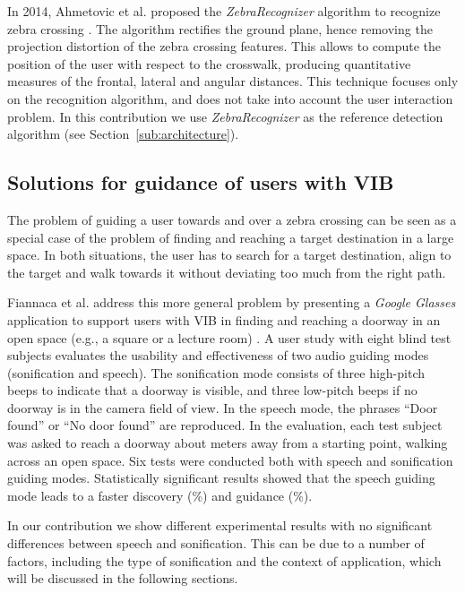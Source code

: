 \documentclass{article}
\begin{document}
In 2014, Ahmetovic et al. proposed the \emph{ZebraRecognizer} algorithm to recognize zebra crossing \cite{AhmetovicICPR2014}.
The algorithm rectifies the ground plane, hence removing the projection distortion of the zebra crossing features. This allows to compute the position of the user with respect to the crosswalk, producing quantitative measures of the frontal, lateral and angular distances.
This technique focuses only on the recognition algorithm, and does not take into account the user interaction problem.
In this contribution we use \emph{ZebraRecognizer} as the reference detection algorithm (see Section~\ref{sub:architecture}).

\subsection{Solutions for guidance of users with VIB}
\label{sub:guidanceRW}
The problem of guiding a user towards and over a zebra crossing can be seen as a special case of the problem of finding and reaching a target destination in a large space.
In both situations, the user has to search for a target destination, align to the target and walk towards it without deviating too much from the right path.

Fiannaca et al. address this more general problem by presenting a \emph{Google Glasses} application to support users with VIB in finding and reaching a doorway in an open space (e.g., a square or a lecture room) \cite{fiannaca}.
A user study with eight blind test subjects evaluates the usability and effectiveness of two audio guiding modes (sonification and speech).
The sonification mode consists of three high-pitch beeps to indicate that a doorway is visible, and three low-pitch beeps if no doorway is in the camera field of view.
In the speech mode, the phrases ``Door found'' or ``No door found'' are reproduced.
In the evaluation, each test subject was asked to reach a doorway about  meters away from a starting point, walking across an open space.
Six tests were conducted both with speech and sonification guiding modes.
Statistically significant results showed that the speech guiding mode leads to a faster discovery (\%) and guidance (\%).

In our contribution we show different experimental results with no significant differences
between speech and sonification. This can be due to a number of factors, including the type of sonification and the context of application, which will be discussed in the following sections.
\end{document}
